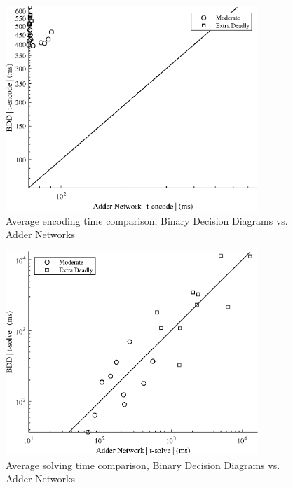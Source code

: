 {\begin{figure}
    \centering
    \includegraphics[width = 0.85\textwidth]{Figures/killer_encode_compare.eps}
    \caption{Average encoding time comparison, Binary Decision Diagrams vs. Adder Networks}
    \label{killerCompareEncode}
\end{figure}

\begin{figure}
    \centering
    \includegraphics[width = 0.85\textwidth]{Figures/killer_solve_compare.eps}
    \caption{Average solving time comparison, Binary Decision Diagrams vs. Adder Networks}
    \label{killerCompareSolve}
\end{figure}
}


